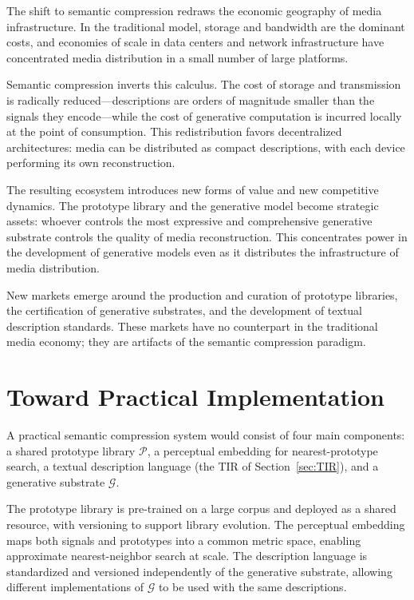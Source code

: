 \documentclass[12pt,a4paper]{article}
\theoremstyle{definition}
\theoremstyle{remark}
\begin{document}
The shift to semantic compression redraws the economic geography of media infrastructure. In the traditional model, storage and bandwidth are the dominant costs, and economies of scale in data centers and network infrastructure have concentrated media distribution in a small number of large platforms.

Semantic compression inverts this calculus. The cost of storage and transmission is radically reduced---descriptions are orders of magnitude smaller than the signals they encode---while the cost of generative computation is incurred locally at the point of consumption. This redistribution favors decentralized architectures: media can be distributed as compact descriptions, with each device performing its own reconstruction.

The resulting ecosystem introduces new forms of value and new competitive dynamics. The prototype library and the generative model become strategic assets: whoever controls the most expressive and comprehensive generative substrate controls the quality of media reconstruction. This concentrates power in the development of generative models even as it distributes the infrastructure of media distribution.

New markets emerge around the production and curation of prototype libraries, the certification of generative substrates, and the development of textual description standards. These markets have no counterpart in the traditional media economy; they are artifacts of the semantic compression paradigm.

\section{Toward Practical Implementation}
\label{sec:implementation}

A practical semantic compression system would consist of four main components: a shared prototype library $\mathcal{P}$, a perceptual embedding for nearest-prototype search, a textual description language (the TIR of Section~\ref{sec:TIR}), and a generative substrate $\mathcal{G}$.

The prototype library is pre-trained on a large corpus and deployed as a shared resource, with versioning to support library evolution. The perceptual embedding maps both signals and prototypes into a common metric space, enabling approximate nearest-neighbor search at scale. The description language is standardized and versioned independently of the generative substrate, allowing different implementations of $\mathcal{G}$ to be used with the same descriptions.
\end{document}
